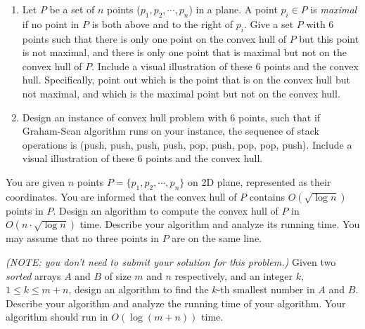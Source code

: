 \documentclass[11pt]{article}
\begin{document}
\begin{qunlist}
\begin{enumerate}
\item Let $P$ be a set of $n$ points ($p_1, p_2, \cdots, p_n$) in a plane. A point
$p_i \in P$ is \emph{maximal} if no point in $P$ is both above and to the right
of $p_i$. Give a set $P$ with 6 points such that there is only one point on the convex hull
of $P$ but this point is not maximal, and there is only one point that is maximal but not on the convex hull of $P$.
Include a visual illustration of these 6 points and the convex hull.  
Specifically, point out which is the point that is on the convex hull but not maximal, and which
is the maximal point but not on the convex hull.
\item Design an instance of convex hull problem with 6 points, such that if
Graham-Scan algorithm runs on your instance, the sequence of stack operations
is (push, push, push, push, pop, push, pop, pop, push).
Include a visual illustration of these 6 points and the convex hull.  
\end{enumerate}

You are given $n$ points $P = \{ p_1, p_2 , \cdots, p_n \}$ on 2D plane, represented as
their coordinates. You are informed that the convex hull of $P$ contains 
$O(\sqrt{\log n})$ points in $P$.  Design an algorithm to compute the convex
hull of $P$ in $O(n\cdot \sqrt{\log n})$ time. Describe your algorithm 
and analyze its running time.
You may assume that no three points in $P$ are on the same line.


\emph{(NOTE: you don't need to submit your solution for this problem.)}
Given two \emph{sorted} arrays $A$ and $B$ of size $m$ and $n$ respectively, and an integer $k$, $1\le k \le m + n$,
design an algorithm to find the $k$-th smallest number in $A$ and $B$.
Describe your algorithm and analyze the running time of your algorithm.
Your algorithm should run in $O(\log(m+n))$ time.




\end{qunlist}
\end{document}
